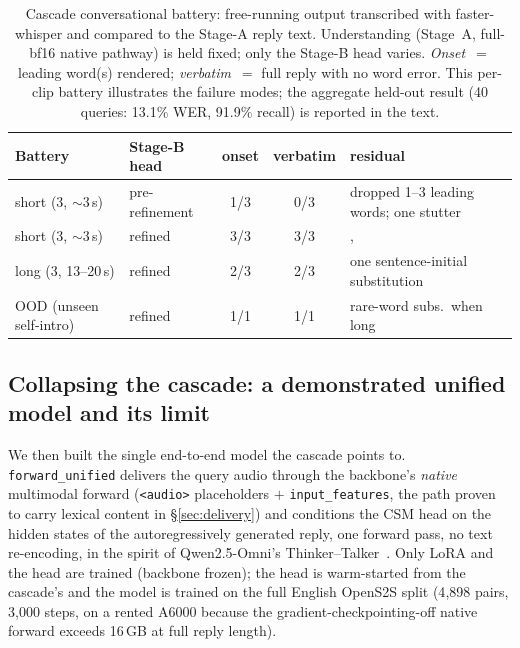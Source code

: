 \documentclass[11pt]{article}
\begin{document}
\begin{table}[tbp]\centering
\caption{Cascade conversational battery: free-running output transcribed with
faster-whisper and compared to the Stage-A reply text. Understanding (Stage~A,
full-bf16 native pathway) is held fixed; only the Stage-B head varies.
\emph{Onset}~$=$ leading word(s) rendered; \emph{verbatim}~$=$ full reply with no
word error. This per-clip battery illustrates the failure modes; the aggregate
held-out result (40 queries: 13.1\% WER, 91.9\% recall) is reported in the text.}
\label{tab:cascade}
\small
\begin{tabular}{llccp{3.4cm}}\toprule
Battery & Stage-B head & onset & verbatim & residual \\ \midrule
short (3, ${\sim}3$\,s)       & pre-refinement & 1/3 & 0/3 & dropped 1--3 leading words; one stutter \\
short (3, ${\sim}3$\,s)       & refined        & 3/3 & 3/3 &, \\
long (3, 13--20\,s)           & refined        & 2/3 & 2/3 & one sentence-initial substitution \\
OOD (unseen self-intro)       & refined        & 1/1 & 1/1 & rare-word subs.\ when long \\ \bottomrule
\end{tabular}
\end{table}

\subsection{Collapsing the cascade: a demonstrated unified model and its limit}
\label{sec:unified}
We then built the single end-to-end model the cascade points to. \texttt{forward\_unified}
delivers the query audio through the backbone's \emph{native} multimodal forward
(\texttt{<audio>} placeholders $+$ \texttt{input\_features}, the path proven to carry
lexical content in \S\ref{sec:delivery}) and conditions the CSM head on the hidden
states of the autoregressively generated reply, one forward pass, no text
re-encoding, in the spirit of Qwen2.5-Omni's Thinker--Talker~\citep{xu2025qwen25omni}.
Only LoRA and the head are trained (backbone frozen); the head is warm-started from
the cascade's and the model is trained on the full English OpenS2S split
(4{,}898 pairs, 3{,}000 steps, on a rented A6000 because the gradient-checkpointing-off
native forward exceeds 16\,GB at full reply length).
\end{document}
